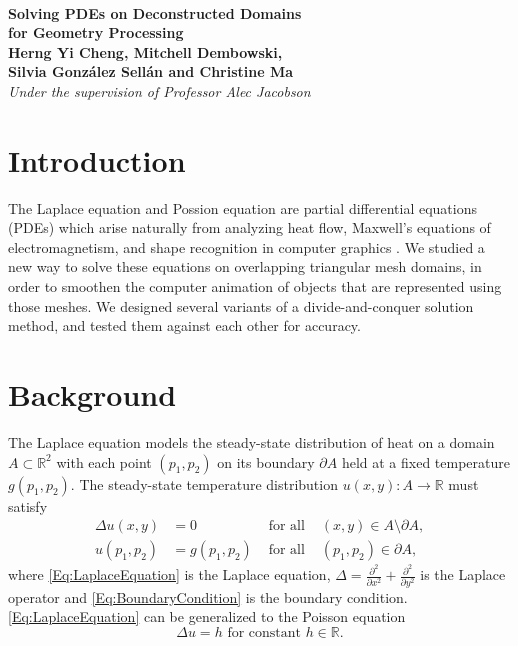 \documentclass[11pt,a4paper, final, twoside]{article}
\theoremstyle{proposition}
\theoremstyle{definition}
\theoremstyle{remark}
\numberwithin{equation}{section}
\begin{document}



\newcommand{\R}{\mathbb{R}}
\newcommand{\m}{\mathsf}
\newcommand{\lap}{\Delta}
\newcommand{\tp}{^\intercal}
\newcommand{\mesh}{\mathcal{M}}

\begin{center}

{\Large \textbf{\\Solving PDEs on Deconstructed Domains\\for Geometry Processing}}\\[5mm]
{\large \textbf{Herng Yi Cheng, Mitchell Dembowski, \\Silvia Gonz\'alez Sell\'an and Christine Ma }\\[1mm]}
{\normalsize \emph{Under the supervision of Professor Alec Jacobson}\\[1mm]}
\end{center}

\section{Introduction}

The Laplace equation and Possion equation are partial differential equations (PDEs) which arise naturally from analyzing heat flow, Maxwell's equations of electromagnetism, and shape recognition in computer graphics \cite{ShapeRepresentation}. We studied a new way to solve these equations on overlapping triangular mesh domains, in order to smoothen the computer animation of objects that are represented using those meshes. We designed several variants of a divide-and-conquer solution method, and tested them against each other for accuracy.

\section{Background}\label{I1}

The Laplace equation models the steady-state distribution of heat on a domain $A \subset \R^2$ with each point $(p_1,p_2)$ on its boundary $\partial A$ held at a fixed temperature $g(p_1,p_2)$. The steady-state temperature distribution $u(x,y) : A \to \R$ must satisfy
\begin{align}
\lap u (x,y) &= 0 &\text{ for all } &(x,y) \in A\setminus\partial A,\label{Eq:LaplaceEquation}\\
u(p_1,p_2) &= g(p_1,p_2) &\text{ for all } &(p_1,p_2) \in \partial A\label{Eq:BoundaryCondition},
\end{align}
where \eqref{Eq:LaplaceEquation} is the Laplace equation, $\lap = \frac{\partial^2}{\partial x^2} + \frac{\partial^2}{\partial y^2}$ is the Laplace operator and \eqref{Eq:BoundaryCondition} is the boundary condition. \eqref{Eq:LaplaceEquation} can be generalized to the Poisson equation
\begin{equation}
\lap u = h \text{ for constant } h \in \R.
\end{equation}
\end{document}
